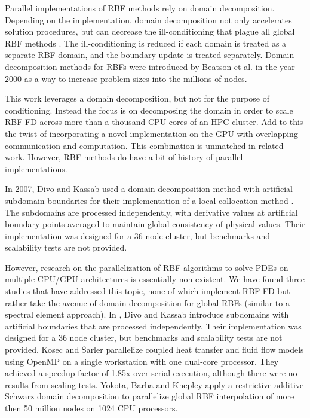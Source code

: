 \documentclass[11pt]{report}
\begin{document}
Parallel implementations of RBF methods rely on domain decomposition. Depending on the implementation, domain decomposition not only accelerates solution procedures, but can decrease the ill-conditioning that plague all global RBF methods \cite{Divo2007}. The ill-conditioning is reduced if each domain is treated as a separate RBF domain, and the boundary update is treated separately. Domain decomposition methods for RBFs were introduced by Beatson et al. \cite{Beatson2000} in the year 2000 as a way to increase problem sizes into the millions of nodes.

This work leverages a domain decomposition, but not for the purpose of conditioning. Instead the focus is on decomposing the domain in order to scale RBF-FD across more than a thousand CPU cores of an HPC cluster. Add to this the twist of incorporating a novel implementation on the GPU with overlapping communication and computation. This combination is unmatched in related work. However, RBF methods do have a bit of history of parallel implementations. 

In 2007, Divo and Kassab \cite{Divo2007} used a domain decomposition method with artificial 
subdomain boundaries for their implementation of a local collocation method \cite{Divo2007}. 
The subdomains are processed independently, with derivative values 
at artificial boundary points averaged to maintain global consistency of physical values. Their implementation 
was designed for a 36 node cluster, but benchmarks and scalability tests are not provided.

However, research on the parallelization of RBF algorithms to solve PDEs on multiple CPU/GPU architectures is essentially non-existent. We have found three studies that have addressed this topic, none of which implement RBF-FD but rather take the avenue of domain decomposition for global RBFs (similar to a spectral element approach). In \cite{Divo2007}, Divo and Kassab introduce subdomains with artificial boundaries that are processed independently. Their implementation was designed for a 36 node cluster, but benchmarks and scalability tests are not provided. Kosec and \v{S}arler \cite{Kosec2008} parallelize coupled heat transfer and fluid flow models using OpenMP on a single workstation with one dual-core processor. They achieved a speedup factor of 1.85x over serial execution, although there were
no results from scaling tests. Yokota, Barba and Knepley \cite{Yokota2010} apply a restrictive additive Schwarz domain decomposition to parallelize global RBF interpolation of more then 50 million nodes on 1024 CPU processors.
\end{document}
